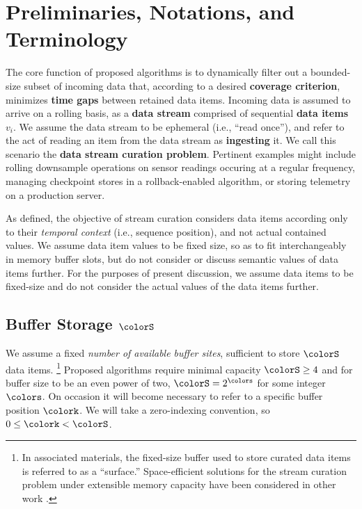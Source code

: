 \section{Preliminaries, Notations, and Terminology} \label{sec:notation}



The core function of proposed algorithms is to dynamically filter out a bounded-size subset of incoming data that, according to a desired \textbf{coverage criterion}, minimizes \textbf{time gaps} between retained data items.
Incoming data is assumed to arrive on a rolling basis, as a \textbf{data stream} comprised of sequential \textbf{data items} $v_i$.
We assume the data stream to be ephemeral (i.e., ``read once''), and refer to the act of reading an item from the data stream as \textbf{ingesting} it.
We call this scenario the \textbf{data stream curation problem}.
Pertinent examples might include rolling downsample operations on sensor readings occuring at a regular frequency, managing checkpoint stores in a rollback-enabled algorithm, or storing telemetry on a production server.

As defined, the objective of stream curation considers data items according only to their \textit{temporal context} (i.e., sequence position), and not actual contained values.
We assume data item values to be fixed size, so as to fit interchangeably in memory buffer slots, but do not consider or discuss semantic values of data items further.
For the purposes of present discussion, we assume data items to be fixed-size and do not consider the actual values of the data items further.

\subsection{Buffer Storage $\colorS$}
\label{sec:notation-buffer}

We assume a fixed \textit{number of available buffer sites}, sufficient to store $\colorS$ data items.%
\footnote{%
In associated materials, the fixed-size buffer used to store curated data items is referred to as a ``surface.''
Space-efficient solutions for the stream curation problem under extensible memory capacity have been considered in other work \citep{moreno2024algorithms}.%
}
Proposed algorithms require minimal capacity $\colorS\geq4$ and for buffer size to be an even power of two, $\colorS = 2^{\colors}$ for some integer $\colors$.
On occasion it will become necessary to refer to a specific buffer position $\colork$.
We will take a zero-indexing convention, so $0 \leq \colork < \colorS$.

